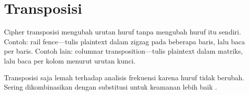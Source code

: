 \section{Transposisi}

Cipher transposisi mengubah urutan huruf tanpa mengubah huruf itu sendiri. Contoh: rail fence---tulis plaintext dalam zigzag pada beberapa baris, lalu baca per baris. Contoh lain: columnar transposition---tulis plaintext dalam matriks, lalu baca per kolom menurut urutan kunci.

Transposisi saja lemah terhadap analisis frekuensi karena huruf tidak berubah. Sering dikombinasikan dengan substitusi untuk keamanan lebih baik \cite{stallings2017,trappe2006}.
